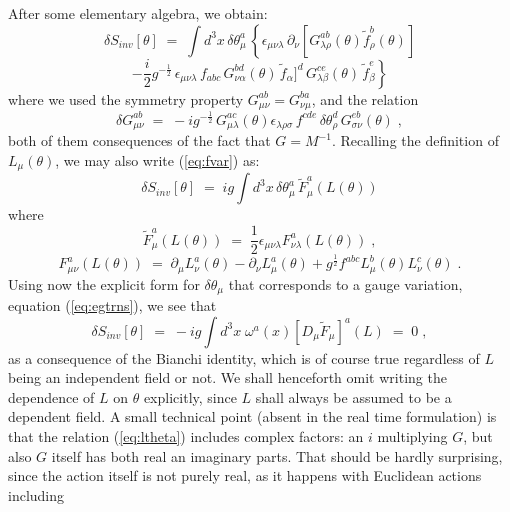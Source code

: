 \documentclass[a4paper,12pt]{article}
\begin{document}
After some elementary algebra, we obtain:
$$
\delta S_{inv}[\theta] \;=\; \int d^3x \,\delta\theta_\mu^a \,
\left\{ \epsilon_{\mu\nu\lambda}\,\partial_\nu
[  G_{\lambda\rho}^{ab}(\theta) {\tilde f}_\rho^b(\theta) ] \right.
$$
\begin{equation}\label{eq:fvar}
\left. -\frac{i}{2} g^{-\frac{1}{2}} \,  \epsilon_{\mu\nu\lambda}
\, f_{abc}\, G_{\nu\alpha}^{bd}(\theta)\,{\tilde f}_\alpha]^d
\, G_{\lambda\beta}^{ce}(\theta) \, {\tilde f}_\beta^e \right\}
\end{equation}
where we used the symmetry property $G_{\mu\nu}^{ab} = G_{\nu\mu}^{ba}$, and
the relation
\begin{equation}
\delta G_{\mu\nu}^{ab} \;=\; - i g^{-\frac{1}{2}}\,
G_{\mu\lambda}^{ac}(\theta)\epsilon_{\lambda\rho\sigma} \, f^{cde} \,
\delta\theta_{\rho}^d \,  G_{\sigma\nu}^{eb} (\theta)\;,
\end{equation}
both of them consequences of the fact that $G = M^{-1}$.
Recalling the definition of $L_\mu(\theta)$, we may also write
(\ref{eq:fvar}) as:
\begin{equation}\label{eq:fvar1}
\delta S_{inv}[\theta] \;=\; i g \int d^3x \, \delta\theta_\mu^a \,
{\tilde F}_\mu^a (L(\theta))
\end{equation}
where
$$
{\tilde F}_\mu^a (L(\theta)) \;=\; \frac{1}{2}
\epsilon_{\mu\nu\lambda} F^a_{\nu\lambda}(L(\theta)) \;,
$$
\begin{equation}\label{eq:defF}
F_{\mu\nu}^a (L(\theta)) \;=\; \partial_\mu L_\nu^a (\theta) - \partial_\nu
L_\mu^a(\theta) + g^{\frac{1}{2}} f^{abc}L_\mu^b(\theta) L_\nu^c
(\theta)\;.
\end{equation}
Using now the explicit form for $\delta\theta_\mu$ that corresponds to
a gauge variation, equation (\ref{eq:egtrns}), we see that
\begin{equation}
\delta S_{inv}[\theta] \;=\; - i g \int d^3x \; \omega^a (x)
[D_\mu {\tilde F}_\mu ]^a(L) \;=\;0 \;,
\end{equation}
as a consequence of the Bianchi identity, which is of course true
regardless of $L$ being an independent field or not. We shall
henceforth omit writing the dependence of $L$ on $\theta$ explicitly,
since $L$ shall always be assumed to be a dependent field.  A small
technical point (absent in the real time formulation) is that the
relation (\ref{eq:ltheta}) includes complex factors: an $i$
multiplying $G$, but also $G$ itself has both real an imaginary parts.
That should be hardly surprising, since the action itself is not
purely real, as it happens with Euclidean actions including
\end{document}
